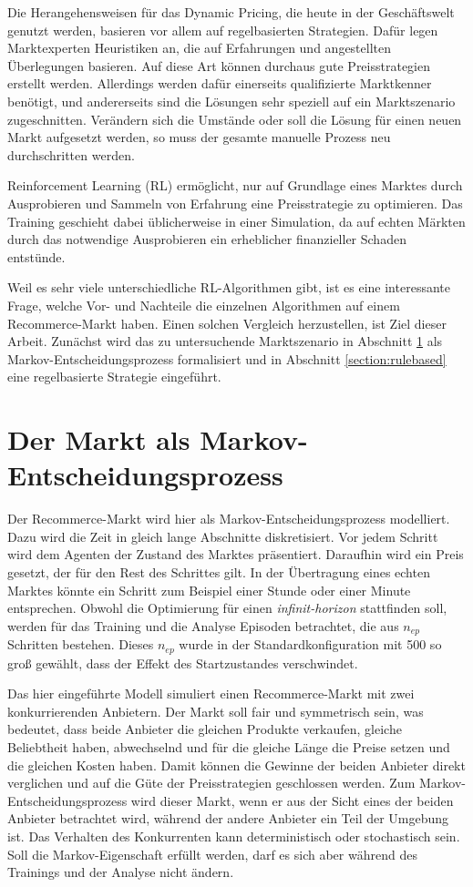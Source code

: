 Die Herangehensweisen für das Dynamic Pricing, die heute in der Geschäftswelt genutzt werden, basieren vor allem auf regelbasierten Strategien.
Dafür legen Marktexperten Heuristiken an, die auf Erfahrungen und angestellten Überlegungen basieren.
Auf diese Art können durchaus gute Preisstrategien erstellt werden.
Allerdings werden dafür einerseits qualifizierte Marktkenner benötigt, und andererseits sind die Lösungen sehr speziell auf ein Marktszenario zugeschnitten.
Verändern sich die Umstände oder soll die Lösung für einen neuen Markt aufgesetzt werden, so muss der gesamte manuelle Prozess neu durchschritten werden.

Reinforcement Learning (RL) ermöglicht, nur auf Grundlage eines Marktes durch Ausprobieren und Sammeln von Erfahrung eine Preisstrategie zu optimieren.
Das Training geschieht dabei üblicherweise in einer Simulation, da auf echten Märkten durch das notwendige Ausprobieren ein erheblicher finanzieller Schaden entstünde.

Weil es sehr viele unterschiedliche RL-Algorithmen gibt, ist es eine interessante Frage, welche Vor- und Nachteile die einzelnen Algorithmen auf einem Recommerce-Markt haben.
Einen solchen Vergleich herzustellen, ist Ziel dieser Arbeit.
Zunächst wird das zu untersuchende Marktszenario in Abschnitt \ref{section:markov} als Markov-Entscheidungsprozess formalisiert und in Abschnitt \ref{section:rulebased} eine regelbasierte Strategie eingeführt.

\section{Der Markt als Markov-Entscheidungsprozess}
\label{section:markov}
Der Recommerce-Markt wird hier als Markov-Entscheidungsprozess modelliert.
Dazu wird die Zeit in gleich lange Abschnitte diskretisiert.
Vor jedem Schritt wird dem Agenten der Zustand des Marktes präsentiert.
Daraufhin wird ein Preis gesetzt, der für den Rest des Schrittes gilt.
In der Übertragung eines echten Marktes könnte ein Schritt zum Beispiel einer Stunde oder einer Minute entsprechen.
Obwohl die Optimierung für einen \textit{infinit-horizon} stattfinden soll, werden für das Training und die Analyse Episoden betrachtet, die aus $n_{ep}$ Schritten bestehen.
Dieses $n_{ep}$ wurde in der Standardkonfiguration mit 500 so groß gewählt, dass der Effekt des Startzustandes verschwindet.

Das hier eingeführte Modell simuliert einen Recommerce-Markt mit zwei konkurrierenden Anbietern.
Der Markt soll fair und symmetrisch sein, was bedeutet, dass beide Anbieter die gleichen Produkte verkaufen, gleiche Beliebtheit haben, abwechselnd und für die gleiche Länge die Preise setzen und die gleichen Kosten haben.
Damit können die Gewinne der beiden Anbieter direkt verglichen und auf die Güte der Preisstrategien geschlossen werden.
Zum Markov-Entscheidungsprozess wird dieser Markt, wenn er aus der Sicht eines der beiden Anbieter betrachtet wird, während der andere Anbieter ein Teil der Umgebung ist.
Das Verhalten des Konkurrenten kann deterministisch oder stochastisch sein.
Soll die Markov-Eigenschaft erfüllt werden, darf es sich aber während des Trainings und der Analyse nicht ändern.

